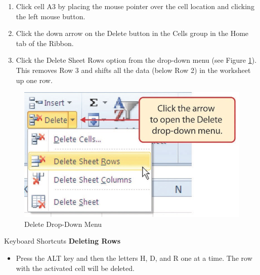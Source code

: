 \begin{enumerate}
	\item Click cell \textsf{A3} by placing the mouse pointer over the cell location and clicking the left mouse button.
	\item Click the down arrow on the Delete button in the Cells group in the Home tab of the Ribbon.
	\item Click the Delete Sheet Rows option from the drop-down menu (see Figure \ref{01:fig31}). This removes Row 3 and shifts all the data (below Row 2) in the worksheet up one row.
\end{enumerate}

\begin{figure}[H]
	\centering
	\includegraphics[width=\maxwidth{.95\linewidth}]{gfx/ch01_fig31}
	\caption{Delete Drop-Down Menu}
	\label{01:fig31}
\end{figure}

\begin{center}
	\begin{shtcutbox}{Keyboard Shortcuts}
		\textbf{Deleting Rows}
		\\
		\begin{itemize}
			\setlength{\itemsep}{0pt}
			\setlength{\parskip}{0pt}
			\setlength{\parsep}{0pt}
			
			\item Press the ALT key and then the letters H, D, and R one at a time. The row with the activated cell will be deleted.
			
		\end{itemize}
	\end{shtcutbox}
\end{center}

